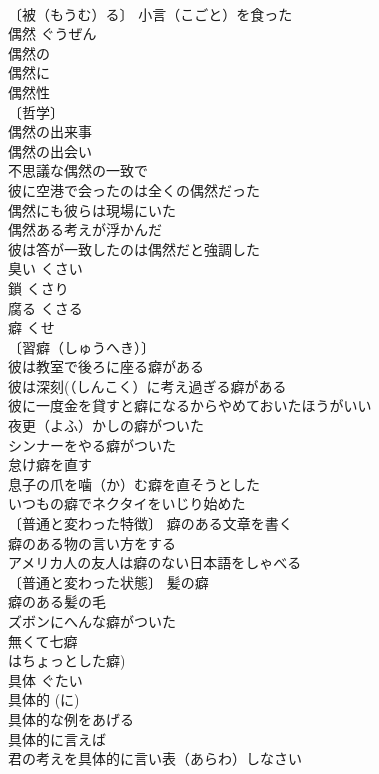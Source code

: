 \documentclass[8pt]{extreport}
\begin{document}
\begin{CJK}{UTF8}{min}
\\	〔被（もうむ）る〕 小言（こごと）を食った 
\\	偶然	ぐうぜん	
\\	偶然の 
\\	偶然に 
\\	偶然性 
\\	〔哲学〕
\\	偶然の出来事 
\\	偶然の出会い 
\\	不思議な偶然の一致で 
\\	彼に空港で会ったのは全くの偶然だった 
\\	偶然にも彼らは現場にいた 
\\	偶然ある考えが浮かんだ 
\\	彼は答が一致したのは偶然だと強調した 
\\	臭い	くさい	
\\	鎖	くさり	
\\	腐る	くさる	
\\	癖	くせ	
\\	〔習癖（しゅうへき）〕
\\	彼は教室で後ろに座る癖がある 
\\	彼は深刻(（しんこく）に考え過ぎる癖がある 
\\	彼に一度金を貸すと癖になるからやめておいたほうがいい 
\\	夜更（よふ）かしの癖がついた 
\\	シンナーをやる癖がついた 
\\	怠け癖を直す 
\\	息子の爪を噛（か）む癖を直そうとした 
\\	いつもの癖でネクタイをいじり始めた 
\\	〔普通と変わった特徴〕 癖のある文章を書く 
\\	癖のある物の言い方をする 
\\	アメリカ人の友人は癖のない日本語をしゃべる 
\\	〔普通と変わった状態〕 髪の癖 
\\	癖のある髪の毛 
\\	ズボンにへんな癖がついた 
\\	無くて七癖 
\\	はちょっとした癖)
\\	具体	ぐたい	
\\	具体的 (に) 
\\	具体的な例をあげる 
\\	具体的に言えば 
\\	君の考えを具体的に言い表（あらわ）しなさい 

\end{CJK}
\end{document}
